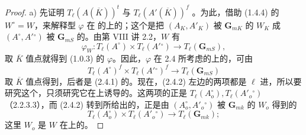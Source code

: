 \begin{proof}
a) 先证明 $T_\ell(A(\overline K))^t$ 与 $T_\ell(A'(\overline K))^f$ 。为此，借助 (1.4.4) 的 $W^\circ=W$，来解释型 $\varphi$ 在 的上的；这个是把 $(A_K,A'_K)$ 被 $\mathbf G_{mK}$ 的 $W_K$ 成 $(A^\circ,A'{}^\circ)$ 被 $\mathbf G_{mS}$ 的。由第 VIII 讲 2.2，$W$ 有
\[\varphi_W:T_\ell(A^\circ)\times T_\ell(A'{}^\circ)\longrightarrow T_\ell(\mathbf G_{mS}),\tag{2.4.1}\]
取 $\overline K$ 值点就得到 (1.0.3) 的 $\varphi$。因此，$\varphi$ 在 2.4 所考虑的上的，可由
\[T_\ell(A^\circ)^f\times T_\ell(A'{}^\circ)^f\longrightarrow T_\ell(\mathbf G_{mS})\tag{2.4.2}\]
取 $\overline K$ 值点得到，后者是 (2.4.1) 的。现在，(2.4.2) 左边的两项都是 $\ell$ 进，所以要研究这个，只须研究它在上诱导的。这两项的正是  $T_\ell(A_o^\circ),T_\ell(A'_o{}^\circ)$（2.2.3.3），而 (2.4.2) 转到所给出的，正是由 $(A_o^\circ,A'_o{}^\circ)$ 被 $\mathbf G_{mk}$ 的 $W_o$ 得到的
\[T_\ell(A_o^\circ)\times T_\ell(A'_o{}^\circ)\longrightarrow T_\ell(\mathbf G_{mk});\tag{2.4.3}\]
这里 $W_o$ 是 $W$ 在上的。


\end{proof}
